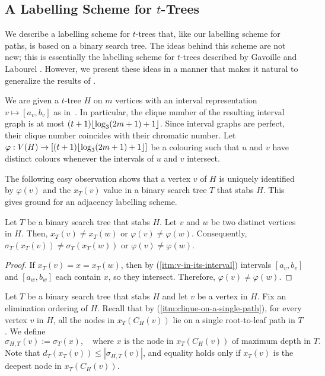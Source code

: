 \documentclass[kpfonts]{patmorin}
\let\le\leqslant
\newcommand{\itemref}[1]{(\ref{#1})}
\begin{document}
\subsection{A Labelling Scheme for $t$-Trees}
\label{sec:t-trees}

We describe a labelling scheme for $t$-trees that, like our labelling scheme for paths, is based on a binary search tree.  The ideas behind this scheme are not new; this is essentially the labelling scheme for $t$-trees described by Gavoille and Labourel \cite{gavoille.labourel:shorter}.  However, we present these ideas in a manner that makes it natural to generalize the results of .


We are given a $t$-tree $H$ on $m$ vertices with an interval representation $v\mapsto[a_v,b_v]$ as in~.  In particular, the clique number of the resulting interval graph is at most $(t+1){\lfloor \log_3(2m+1)+1 \rfloor}$.  Since interval graphs are perfect, their clique number coincides with their chromatic number.  Let $\varphi: V(H) \to [(t+1){\lfloor \log_3(2m+1)+1 \rfloor}]$ be a colouring such that $u$ and $v$ have distinct colours whenever the intervals of $u$ and $v$ intersect.

The following easy observation shows that a vertex $v$ of $H$ is uniquely identified by $\varphi(v)$ and the $x_T(v)$ value in a binary search tree $T$ that stabs $H$.
This gives ground for an adjacency labelling scheme.
\begin{obs}
    Let $T$ be a binary search tree that stabs $H$.
    Let $v$ and $w$ be two distinct vertices in $H$. 
    Then, $x_T(v)\neq x_T(w)$ or $\varphi(v)\neq\varphi(w)$. 
    Consequently, $\sigma_T(x_T(v))\neq \sigma_T(x_T(w))$ or $\varphi(v)\neq\varphi(w)$.
\end{obs}

\begin{proof}
  If $x_T(v)=x=x_T(w)$, then by \itemref{itm:v-in-its-interval} intervals $[a_v,b_v]$ and $[a_w,b_w]$ each contain $x$, 
  so they intersect. 
  Therefore, $\varphi(v)\neq\varphi(w)$.%
\end{proof}

Let $T$ be a binary search tree that stabs $H$ and let $v$ be a vertex in $H$. 
Fix an elimination ordering of $H$. 
Recall that by \itemref{itm:clique-on-a-single-path}, 
for every vertex $v$ in $H$, 
all the nodes in $x_T(C_H(v))$ lie on a single root-to-leaf path in $T$. 
We define
\[
\sigma_{H,T}(v):=\sigma_T(x),\quad\text{where $x$ is the node in $x_T(C_H(v))$ of maximum depth in $T$.}
\]
Note that $d_T(x_T(v))\le |\sigma_{H,T}(v)|$, and equality holds only if $x_T(v)$ is the deepest node in $x_T(C_H(v))$.
\end{document}
